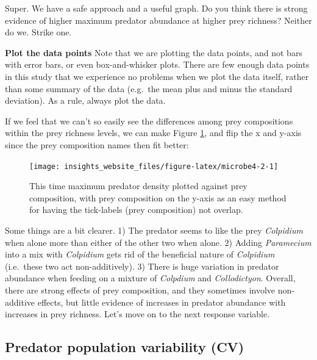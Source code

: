 \documentclass[]{book}
\makeatletter
\newenvironment{kframe}{%
\medskip{}
\setlength{\fboxsep}{.8em}
 \def\at@end@of@kframe{}%
 \ifinner\ifhmode%
  \def\at@end@of@kframe{\end{minipage}}%
  \begin{minipage}{\columnwidth}%
 \fi\fi%
 \def\FrameCommand##1{\hskip\@totalleftmargin \hskip-\fboxsep
 \colorbox{shadecolor}{##1}\hskip-\fboxsep
     \hskip-\linewidth \hskip-\@totalleftmargin \hskip\columnwidth}%
 \MakeFramed {\advance\hsize-\width
   \@totalleftmargin\z@ \linewidth\hsize
   \@setminipage}}%
 {\par\unskip\endMakeFramed%
 \at@end@of@kframe}
\newenvironment{rmdblock}[1]
  {
  \begin{itemize}
  \renewcommand{\labelitemi}{
    \raisebox{-.7\height}[0pt][0pt]{
      {\setkeys{Gin}{width=3em,keepaspectratio}\texttt{[image: images/\#1]}}
    }
  }
  \setlength{\fboxsep}{1em}
  \begin{kframe}
  \item
  }
  {
  \end{kframe}
  \end{itemize}
  }
\newenvironment{reliability}
  {\begin{rmdblock}{reliability}}
  {\end{rmdblock}}
\makeatother
\begin{document}
Super. We have a safe approach and a useful graph. Do you think there is strong evidence of higher maximum predator abundance at higher prey richness? Neither do we. Strike one.

\begin{reliability}
\textbf{Plot the data points} Note that we are plotting the data points,
and not bars with error bars, or even box-and-whisker plots. There are
few enough data points in this study that we experience no problems when
we plot the data itself, rather than some summary of the data (e.g.~the
mean plus and minus the standard deviation). As a rule, always plot the
data.
\end{reliability}

If we feel that we can't so easily see the differences among prey compositions within the prey richness levels, we can make Figure \ref{fig:microbe4-2}, and flip the x and y-axis since the prey composition names then fit better:

\begin{figure}

{\centering \texttt{[image: insights\_website\_files/figure-latex/microbe4-2-1]} 

}

\caption{This time maximum predator density plotted against prey composition, with prey composition on the y-axis as an easy method for having the tick-labels (prey composition) not overlap.}\label{fig:microbe4-2}
\end{figure}

Some things are a bit clearer. 1) The predator seems to like the prey \emph{Colpidium} when alone more than either of the other two when alone. 2) Adding \emph{Paramecium} into a mix with \emph{Colpidium} gets rid of the beneficial nature of \emph{Colpidium} (i.e.~these two act non-additively). 3) There is huge variation in predator abundance when feeding on a mixture of \emph{Colpdium} and \emph{Collodictyon}. Overall, there are strong effects of prey composition, and they sometimes involve non-additive effects, but little evidence of increases in predator abundance with increases in prey richness. Let's move on to the next response variable.

\hypertarget{predator-population-variability-cv}{%
\subsection{Predator population variability (CV)}\label{predator-population-variability-cv}}
\end{document}
